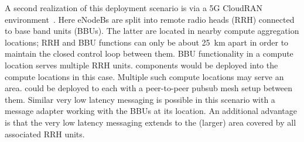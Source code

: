 A second realization of this deployment scenario is via a 5G CloudRAN
environment~\cite{checko2015cloud}. Here eNodeBs are split into remote radio
heads (RRH) connected to base band units (BBUs).  The latter are
located in nearby compute aggregation locations; RRH and BBU functions
can only be about 25~km apart in order to maintain the closed control
loop between them. BBU functionality in a compute location serves
multiple RRH units. \name components would be deployed into the
compute locations in this case.  Multiple such compute locations may
serve an area. \name could be deployed to each with a peer-to-peer
pubsub mesh setup between them.  Similar very low latency messaging is
possible in this scenario with a \name message adapter working with
the BBUs at its location.  An additional advantage is that the very
low latency messaging extends to the (larger) area covered by all
associated RRH units.

